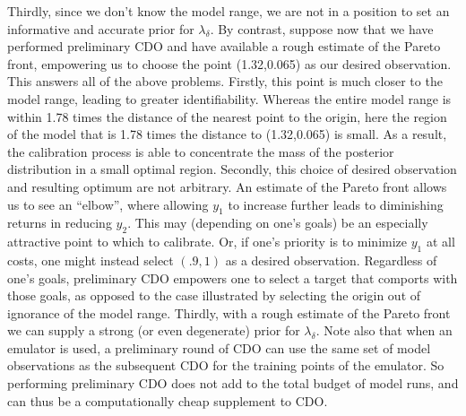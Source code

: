 \documentclass[12pt]{article}
\begin{document}
%
Thirdly, since we don't know the model range, we are not in a position to set an informative and accurate prior for $\lambda_\delta$.
%
By contrast, suppose now that we have performed preliminary CDO and have available a rough estimate of the Pareto front, empowering us to choose the point (1.32,0.065) as our desired observation.
%
This answers all of the above problems.
%
Firstly, this point is much closer to the model range, leading to greater identifiability.
%
Whereas the entire model range is within 1.78 times the distance of the nearest point to the origin, here the region of the model that is 1.78 times the distance to (1.32,0.065) is small.
%
As a result, the calibration process is able to concentrate the mass of the posterior distribution in a small optimal region.
%
Secondly, this choice of desired observation and resulting optimum are not arbitrary.
%
An estimate of the Pareto front allows us to see an ``elbow'', where allowing $y_1$ to increase further leads to diminishing returns in reducing $y_2$.
%
This may (depending on one's goals) be an especially attractive point to which to calibrate.
%
Or, if one's priority is to minimize $y_1$ at all costs, one might instead select $(.9,1)$ as a desired observation.
%
Regardless of one's goals, preliminary CDO empowers one to select a target that comports with those goals, as opposed to the case illustrated by selecting the origin out of ignorance of the model range.
%
Thirdly, with a rough estimate of the Pareto front we can supply a strong (or even degenerate) prior for $\lambda_\delta$.
%
Note also that when an emulator is used, a preliminary round of CDO can use the same set of model observations as the subsequent CDO for the training points of the emulator.
%
So performing preliminary CDO does not add to the total budget of model runs, and can thus be a computationally cheap supplement to CDO.
\end{document}
